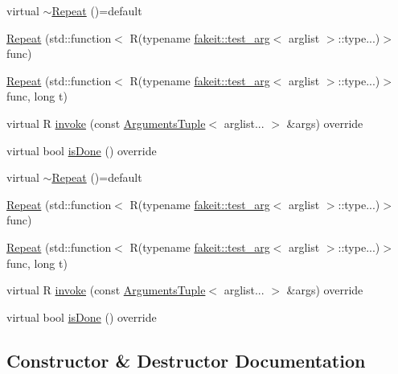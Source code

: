 \begin{DoxyCompactItemize}
\item 
virtual \mbox{\hyperlink{structfakeit_1_1Repeat_a48edc25e2509018e7cc632fcf18eea42}{$\sim$\+Repeat}} ()=default
\item 
\mbox{\hyperlink{structfakeit_1_1Repeat_aee6893820759d2b0fa05975cdbac7e8c}{Repeat}} (std\+::function$<$ R(typename \mbox{\hyperlink{structfakeit_1_1test__arg}{fakeit\+::test\+\_\+arg}}$<$ arglist $>$\+::type...)$>$ func)
\item 
\mbox{\hyperlink{structfakeit_1_1Repeat_a3907a7a5430a75e296424f89c09b5eee}{Repeat}} (std\+::function$<$ R(typename \mbox{\hyperlink{structfakeit_1_1test__arg}{fakeit\+::test\+\_\+arg}}$<$ arglist $>$\+::type...)$>$ func, long t)
\item 
virtual R \mbox{\hyperlink{structfakeit_1_1Repeat_a64e8c3a413edce162acaec724e832e19}{invoke}} (const \mbox{\hyperlink{namespacefakeit_a476a37a598825e1b5dd67b3a176491a1}{Arguments\+Tuple}}$<$ arglist... $>$ \&args) override
\item 
virtual bool \mbox{\hyperlink{structfakeit_1_1Repeat_a4822600fad5bce408fcd03d71ff333eb}{is\+Done}} () override
\item 
virtual \mbox{\hyperlink{structfakeit_1_1Repeat_a48edc25e2509018e7cc632fcf18eea42}{$\sim$\+Repeat}} ()=default
\item 
\mbox{\hyperlink{structfakeit_1_1Repeat_aee6893820759d2b0fa05975cdbac7e8c}{Repeat}} (std\+::function$<$ R(typename \mbox{\hyperlink{structfakeit_1_1test__arg}{fakeit\+::test\+\_\+arg}}$<$ arglist $>$\+::type...)$>$ func)
\item 
\mbox{\hyperlink{structfakeit_1_1Repeat_a3907a7a5430a75e296424f89c09b5eee}{Repeat}} (std\+::function$<$ R(typename \mbox{\hyperlink{structfakeit_1_1test__arg}{fakeit\+::test\+\_\+arg}}$<$ arglist $>$\+::type...)$>$ func, long t)
\item 
virtual R \mbox{\hyperlink{structfakeit_1_1Repeat_a64e8c3a413edce162acaec724e832e19}{invoke}} (const \mbox{\hyperlink{namespacefakeit_a476a37a598825e1b5dd67b3a176491a1}{Arguments\+Tuple}}$<$ arglist... $>$ \&args) override
\item 
virtual bool \mbox{\hyperlink{structfakeit_1_1Repeat_a4822600fad5bce408fcd03d71ff333eb}{is\+Done}} () override
\end{DoxyCompactItemize}


\subsection{Constructor \& Destructor Documentation}
\mbox{\label{structfakeit_1_1Repeat_a48edc25e2509018e7cc632fcf18eea42}} 
